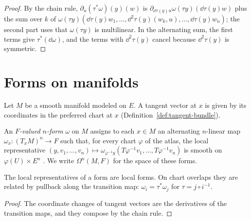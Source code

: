 \begin{proof}
  \leanok
  By the chain rule, $\partial_u (\tau^*\omega)(y)(w)$ is
  $\partial_{\dd\tau(y) u}\omega(\tau y)(\dd\tau(y) w)$ plus the sum over $k$ of
  $\omega(\tau y)(\dd\tau(y) w_1, \dots, \dd^2\tau(y)(w_k, u), \dots, \dd\tau(y) w_n)$; the second
  part uses that $\omega(\tau y)$ is multilinear. In the alternating sum, the first terms give
  $\tau^*(\dd\omega)$, and the terms with $\dd^2\tau(y)$ cancel because $\dd^2\tau(y)$ is
  symmetric.
\end{proof}

\section{Forms on manifolds}

Let $M$ be a smooth manifold modeled on $E$. A tangent vector at $x$ is given by its coordinates
in the preferred chart at $x$ (Definition~\ref{def:tangent-bundle}).

\begin{definition}
  \label{def:diff-form}
  \leanok
  An \emph{$F$-valued $n$-form} $\omega$ on $M$ assigns to each $x \in M$ an alternating
  $n$-linear map $\omega_x \colon (T_xM)^n \to F$ such that, for every chart $\varphi$ of the
  atlas, the local representative
  $(y, v_1, \dots, v_n) \mapsto \omega_{\varphi^{-1} y}(T\varphi^{-1} v_1, \dots,
  T\varphi^{-1} v_n)$ is smooth on $\varphi(U) \times E^n$ \cite[Definition~3.6.1]{GN26}. We
  write $\Omega^n(M, F)$ for the space of these forms.
\end{definition}

\begin{lemma}
  \label{lem:form-localrep}
  \leanok
  The local representatives of a form are local forms. On chart overlaps they are related by
  pullback along the transition map: $\omega_i = \tau^*\omega_j$ for $\tau = j \circ i^{-1}$.
\end{lemma}

\begin{proof}
  \leanok
  The coordinate changes of tangent vectors are the derivatives of the transition maps, and they
  compose by the chain rule.
\end{proof}

